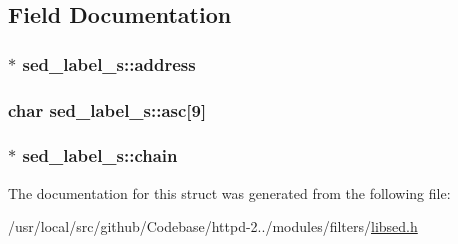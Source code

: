 \subsection{Field Documentation}
\subsubsection[{\texorpdfstring{address}{address}}]{$\ast$ sed\+\_\+label\+\_\+s\+::address}\hypertarget{structsed__label__s_a6f5e48328b58d2cc3ae68c5ac7430f39}{}\label{structsed__label__s_a6f5e48328b58d2cc3ae68c5ac7430f39}
\subsubsection[{\texorpdfstring{asc}{asc}}]{\setlength{\rightskip}{0pt plus 5cm}char sed\+\_\+label\+\_\+s\+::asc\mbox{[}9\mbox{]}}\hypertarget{structsed__label__s_aa0fd72965198b903e2d031ad0dd80d74}{}\label{structsed__label__s_aa0fd72965198b903e2d031ad0dd80d74}
\subsubsection[{\texorpdfstring{chain}{chain}}]{$\ast$ sed\+\_\+label\+\_\+s\+::chain}\hypertarget{structsed__label__s_ae53a1b390beded7818fa3c09162bb0b2}{}\label{structsed__label__s_ae53a1b390beded7818fa3c09162bb0b2}


The documentation for this struct was generated from the following file\+:\begin{DoxyCompactItemize}
\item 
/usr/local/src/github/\+Codebase/httpd-\/2../modules/filters/\hyperlink{libsed_8h}{libsed.\+h}\end{DoxyCompactItemize}
